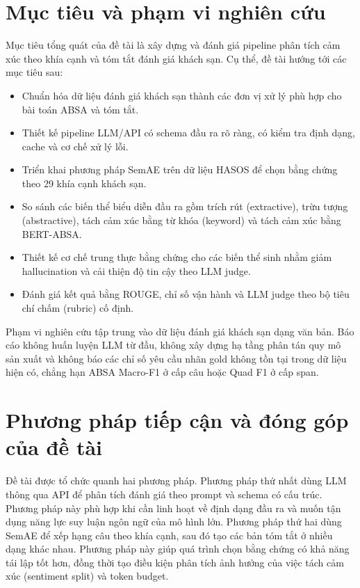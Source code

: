 \documentclass[12pt,a4paper]{report}
\begin{document}
\section{Mục tiêu và phạm vi nghiên cứu}

Mục tiêu tổng quát của đề tài là xây dựng và đánh giá pipeline phân tích cảm xúc theo khía cạnh và tóm tắt đánh giá khách sạn. Cụ thể, đề tài hướng tới các mục tiêu sau:

\begin{itemize}[leftmargin=1.2cm]
    \item Chuẩn hóa dữ liệu đánh giá khách sạn thành các đơn vị xử lý phù hợp cho bài toán ABSA và tóm tắt.
    \item Thiết kế pipeline LLM/API có schema đầu ra rõ ràng, có kiểm tra định dạng, cache và cơ chế xử lý lỗi.
    \item Triển khai phương pháp SemAE trên dữ liệu HASOS để chọn bằng chứng theo 29 khía cạnh khách sạn.
    \item So sánh các biến thể biểu diễn đầu ra gồm trích rút (extractive), trừu tượng (abstractive), tách cảm xúc bằng từ khóa (keyword) và tách cảm xúc bằng BERT-ABSA.
    \item Thiết kế cơ chế trung thực bằng chứng cho các biến thể sinh nhằm giảm hallucination và cải thiện độ tin cậy theo LLM judge.
    \item Đánh giá kết quả bằng ROUGE, chỉ số vận hành và LLM judge theo bộ tiêu chí chấm (rubric) cố định.
\end{itemize}

Phạm vi nghiên cứu tập trung vào dữ liệu đánh giá khách sạn dạng văn bản. Báo cáo không huấn luyện LLM từ đầu, không xây dựng hạ tầng phân tán quy mô sản xuất và không báo các chỉ số yêu cầu nhãn gold không tồn tại trong dữ liệu hiện có, chẳng hạn ABSA Macro-F1 ở cấp câu hoặc Quad F1 ở cấp span.

\section{Phương pháp tiếp cận và đóng góp của đề tài}

Đề tài được tổ chức quanh hai phương pháp. Phương pháp thứ nhất dùng LLM thông qua API để phân tích đánh giá theo prompt và schema có cấu trúc. Phương pháp này phù hợp khi cần linh hoạt về định dạng đầu ra và muốn tận dụng năng lực suy luận ngôn ngữ của mô hình lớn. Phương pháp thứ hai dùng SemAE để xếp hạng câu theo khía cạnh, sau đó tạo các bản tóm tắt ở nhiều dạng khác nhau. Phương pháp này giúp quá trình chọn bằng chứng có khả năng tái lập tốt hơn, đồng thời tạo điều kiện phân tích ảnh hưởng của việc tách cảm xúc (sentiment split) và token budget.
\end{document}
